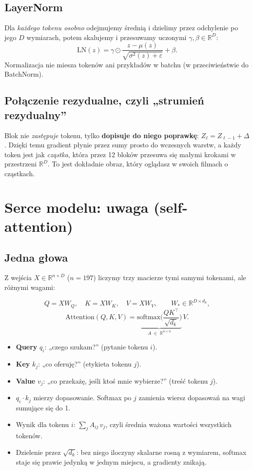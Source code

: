 \documentclass[11pt,a4paper]{article}
\begin{document}
\subsection{LayerNorm}
Dla \emph{każdego tokenu osobno} odejmujemy średnią i dzielimy przez odchylenie po jego $D$
wymiarach, potem skalujemy i przesuwamy uczonymi $\gamma,\beta\in\mathbb{R}^D$:
\[ \mathrm{LN}(z)=\gamma\odot\frac{z-\mu(z)}{\sqrt{\sigma^2(z)+\varepsilon}}+\beta. \]
Normalizacja nie miesza tokenów ani przykładów w batchu (w przeciwieństwie do BatchNorm).

\subsection{Połączenie rezydualne, czyli „strumień rezydualny''}
Blok nie \emph{zastępuje} tokenu, tylko \textbf{dopisuje do niego poprawkę}: $Z_\ell=Z_{\ell-1}+\Delta$.
Dzięki temu gradient płynie przez sumy prosto do wczesnych warstw, a każdy token jest jak
\emph{cząstka}, która przez 12 bloków przesuwa się małymi krokami w przestrzeni $\mathbb{R}^D$.
To jest dokładnie obraz, który oglądasz w swoich filmach o cząstkach.

\section{Serce modelu: uwaga (self-attention)}
\label{sec:uwaga}

\subsection{Jedna głowa}
Z wejścia $X\in\mathbb{R}^{n\times D}$ ($n=197$) liczymy trzy macierze tymi samymi tokenami, ale
różnymi wagami:
\begin{wzor}
\[
Q=XW_Q,\quad K=XW_K,\quad V=XW_V,\qquad W_\ast\in\mathbb{R}^{D\times d_k},
\]
\[
\mathrm{Attention}(Q,K,V)=\underbrace{\mathrm{softmax}\!\Big(\frac{QK^\top}{\sqrt{d_k}}\Big)}_{A\;\in\;\mathbb{R}^{n\times n}}\,V .
\]
\end{wzor}

\begin{itemize}[itemsep=2pt]
  \item \textbf{Query} $q_i$: „czego szukam?'' (pytanie tokenu $i$).
  \item \textbf{Key} $k_j$: „co oferuję?'' (etykieta tokenu $j$).
  \item \textbf{Value} $v_j$: „co przekażę, jeśli ktoś mnie wybierze?'' (treść tokenu $j$).
  \item $q_i\cdot k_j$ mierzy dopasowanie. Softmax po $j$ zamienia wiersz dopasowań na wagi sumujące się do 1.
  \item Wynik dla tokenu $i$: $\sum_j A_{ij}\,v_j$, czyli średnia ważona wartości wszystkich tokenów.
  \item Dzielenie przez $\sqrt{d_k}$: bez niego iloczyny skalarne rosną z wymiarem, softmax staje się prawie jedynką w jednym miejscu, a gradienty znikają.
\end{itemize}
\end{document}
